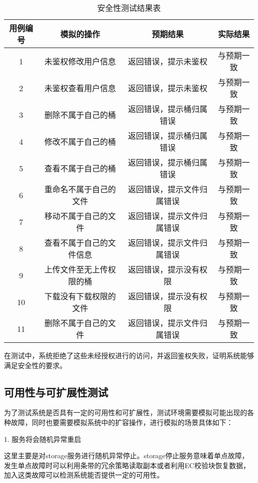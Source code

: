 \begin{table}[h]
  \centering
  \vspace{10pt}
  \caption{安全性测试结果表}
  \vspace{-15pt}
  \begin{tabular}{cccc}
    \toprule
    用例编号 & 模拟的操作   & 预期结果 & 实际结果  \\
    \midrule
    1  & 未鉴权修改用户信息       & 返回错误，提示未鉴权       & 与预期一致\\
    2  & 未鉴权查看用户信息       & 返回错误，提示未鉴权       & 与预期一致\\
    3  & 删除不属于自己的桶       & 返回错误，提示桶归属错误    & 与预期一致 \\
    4  & 修改不属于自己的桶       & 返回错误，提示桶归属错误    & 与预期一致\\
    5  & 查看不属于自己的桶       & 返回错误，提示桶归属错误    & 与预期一致 \\
    6  & 重命名不属于自己的文件    & 返回错误，提示文件归属错误  & 与预期一致\\
    7  & 移动不属于自己的文件      & 返回错误，提示文件归属错误  & 与预期一致\\
    8  & 查看不属于自己的文件信息   & 返回错误，提示文件归属错误  & 与预期一致   \\
    9  & 上传文件至无上传权限的桶   & 返回错误，提示没有权限      & 与预期一致\\
    10 & 下载没有下载权限的文件     & 返回错误，提示没有权限      & 与预期一致\\
    11 & 删除不属于自己的文件       & 返回错误，提示文件归属错误   & 与预期一致 \\
    \bottomrule
  \end{tabular}
\end{table}

在测试中，系统拒绝了这些未经授权进行的访问，并返回鉴权失败，证明系统能够满足安全性的要求。

\subsection{可用性与可扩展性测试}%

为了测试系统是否具有一定的可用性和可扩展性，测试环境需要模拟可能出现的各种故障，同时也要需要模拟系统中的扩容操作，进行模拟的场景具体如下：

1. 服务将会随机异常重启

这里主要是对storage服务进行随机异常停止。storage停止服务意味着单点故障，发生单点故障时可以利用条带的冗余策略读取副本或者利用EC校验块恢复数据，加入这类故障可以检测系统能否提供一定的可用性。

